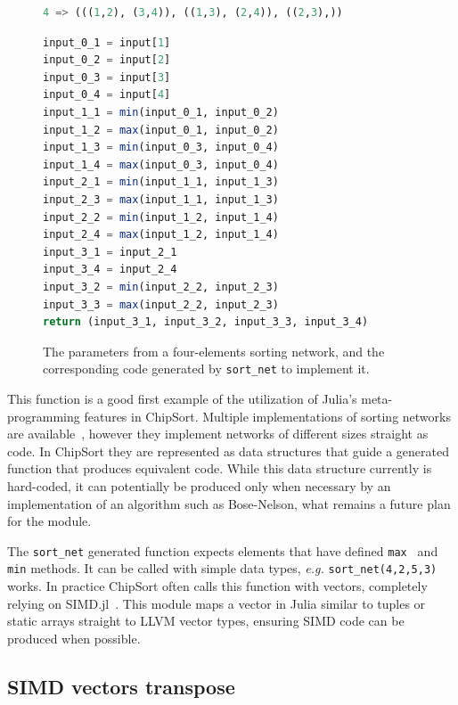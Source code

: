 \documentclass{juliacon}
\begin{document}
\begin{figure}[htb]
\begin{lstlisting}[language = Julia]
4 => (((1,2), (3,4)), ((1,3), (2,4)), ((2,3),))
\end{lstlisting}
\begin{lstlisting}[language = Julia]
input_0_1 = input[1]
input_0_2 = input[2]
input_0_3 = input[3]
input_0_4 = input[4]
input_1_1 = min(input_0_1, input_0_2)
input_1_2 = max(input_0_1, input_0_2)
input_1_3 = min(input_0_3, input_0_4)
input_1_4 = max(input_0_3, input_0_4)
input_2_1 = min(input_1_1, input_1_3)
input_2_3 = max(input_1_1, input_1_3)
input_2_2 = min(input_1_2, input_1_4)
input_2_4 = max(input_1_2, input_1_4)
input_3_1 = input_2_1
input_3_4 = input_2_4
input_3_2 = min(input_2_2, input_2_3)
input_3_3 = max(input_2_2, input_2_3)
return (input_3_1, input_3_2, input_3_3, input_3_4)
\end{lstlisting}
\caption{The parameters from a four-elements sorting network, and the corresponding code generated by {\tt sort\_net} to implement it.}
\label{fig:sort-net-listing}
\end{figure}

This function is a good first example of the utilization of Julia's meta-programming features in ChipSort. Multiple implementations of sorting networks are available~\cite{DBLP:journals/pvldb/ChhuganiNLMHCBKD08,sortingnetworksjl,ultrasort}, however they implement networks of different sizes straight as code. In ChipSort they are represented as data structures that guide a generated function that produces equivalent code. While this data structure currently is hard-coded, it can potentially be produced only when necessary by an implementation of an algorithm such as Bose-Nelson, what remains a future plan for the module.

The {\tt sort\_net} generated function expects elements that have defined {\tt max } and {\tt min} methods. It can be called with simple data types, {\em e.g.} {\tt sort\_net(4,2,5,3)} works. In practice ChipSort often calls this function with vectors, completely relying on SIMD.jl~\cite{erik_schnetter_2019_2592633}. This module maps a vector in Julia similar to tuples or static arrays straight to LLVM vector types, ensuring SIMD code can be produced when possible.

\subsection{SIMD vectors transpose}
\end{document}
